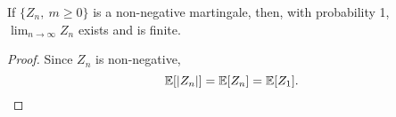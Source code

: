 \documentclass[a4paper,10pt,english]{article}
\begin{document}
\begin{cor}
If $\{Z_n,~m \geq 0\}$ is a non-negative martingale, then, with probability 1, $\lim_{n \rightarrow \infty}Z_n$ exists and is finite.
\end{cor}
\begin{proof}
Since $Z_n$ is non-negative,
\begin{equation*}
\mathbb{E}[|Z_n|]=\mathbb{E}[Z_n]=\mathbb{E}[Z_1].
\end{equation*}
\end{proof}
\end{document}
